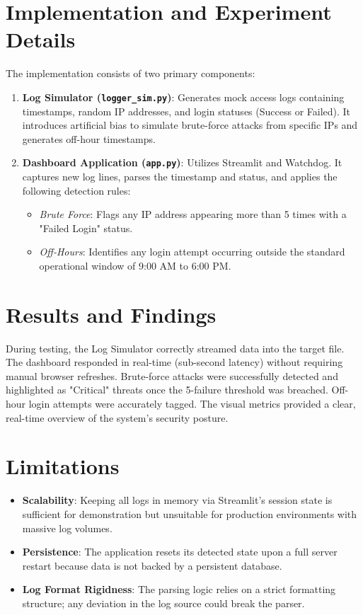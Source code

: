 \documentclass[12pt,a4paper]{article}
\begin{document}
\section{Implementation and Experiment Details}
The implementation consists of two primary components:
\begin{enumerate}
    \item \textbf{Log Simulator (\texttt{logger\_sim.py})}: Generates mock access logs containing timestamps, random IP addresses, and login statuses (Success or Failed). It introduces artificial bias to simulate brute-force attacks from specific IPs and generates off-hour timestamps.
    \item \textbf{Dashboard Application (\texttt{app.py})}: Utilizes Streamlit and Watchdog. It captures new log lines, parses the timestamp and status, and applies the following detection rules:
    \begin{itemize}
        \item \textit{Brute Force}: Flags any IP address appearing more than 5 times with a "Failed Login" status.
        \item \textit{Off-Hours}: Identifies any login attempt occurring outside the standard operational window of 9:00 AM to 6:00 PM.
    \end{itemize}
\end{enumerate}

\section{Results and Findings}
During testing, the Log Simulator correctly streamed data into the target file. The dashboard responded in real-time (sub-second latency) without requiring manual browser refreshes. Brute-force attacks were successfully detected and highlighted as "Critical" threats once the 5-failure threshold was breached. Off-hour login attempts were accurately tagged. The visual metrics provided a clear, real-time overview of the system's security posture.

\section{Limitations}
\begin{itemize}
    \item \textbf{Scalability}: Keeping all logs in memory via Streamlit's session state is sufficient for demonstration but unsuitable for production environments with massive log volumes.
    \item \textbf{Persistence}: The application resets its detected state upon a full server restart because data is not backed by a persistent database.
    \item \textbf{Log Format Rigidness}: The parsing logic relies on a strict formatting structure; any deviation in the log source could break the parser.
\end{itemize}
\end{document}
